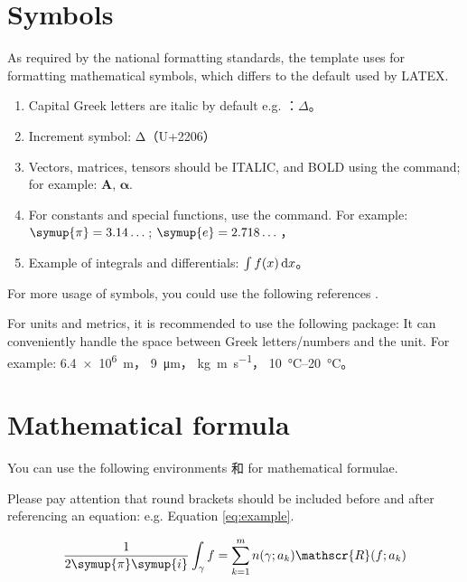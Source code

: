 \section{Symbols}

As required by the national formatting standards, the template uses  for formatting mathematical symbols, which differs to the default used by LATEX. 

\begin{enumerate}
  \item Capital Greek letters are italic by default e.g. ：$\Delta$。
  \item Increment symbol: $\increment$（U+2206）
  \item Vectors, matrices, tensors should be ITALIC, and BOLD using the  command; for example: $\symbf{A}$, $\symbf{\alpha}$.
  \item For constants and special functions, use the  command. For example:
    $\symup{\pi} = 3.14\dots$; $\symup{e} = 2.718\dots$，
  \item Example of integrals and differentials: $\int f(x) \mathop{}\!\mathrm{d} x$。
\end{enumerate}

For more usage of symbols, you could use the following references
\href{http://mirrors.ctan.org/macros/latex/contrib/unicode-math/unicode-math.pdf}{}
\href{http://mirrors.ctan.org/macros/latex/contrib/unicode-math/unimath-symbols.pdf}{}.

For units and metrics, it is recommended to use the following package:
\href{http://mirrors.ctan.org/macros/latex/contrib/siunitx/siunitx.pdf}{}
It can conveniently handle the space between Greek letters/numbers and the unit. For example:
\SI{6.4e6}{m}，
\SI{9}{\micro\meter}，
\si{kg.m.s^{-1}}，
\SIrange{10}{20}{\degreeCelsius}。



\section{Mathematical formula}

You can use the following environments  和  for mathematical formulae.

Please pay attention that round brackets should be included before and after referencing an equation: e.g. Equation \eqref{eq:example}.

\begin{equation}
  \frac{1}{2 \symup{\pi} \symup{i}} \int_\gamma f = \sum_{k=1}^m n(\gamma; a_k) \mathscr{R}(f; a_k)
  \label{eq:example}
\end{equation}

